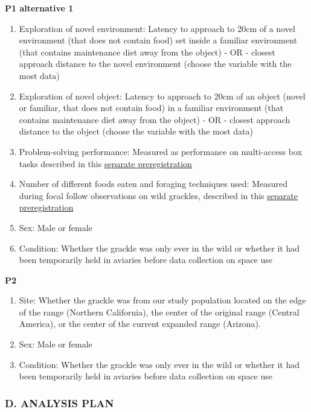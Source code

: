 \documentclass[]{article}
\begin{document}
\textbf{P1 alternative 1}

\begin{enumerate}
\def\labelenumi{\arabic{enumi})}
\item
  Exploration of novel environment: Latency to approach to 20cm of a
  novel environment (that does not contain food) set inside a familiar
  environment (that contains maintenance diet away from the object) - OR
  - closest approach distance to the novel environment (choose the
  variable with the most data)
\item
  Exploration of novel object: Latency to approach to 20cm of an object
  (novel or familiar, that does not contain food) in a familiar
  environment (that contains maintenance diet away from the object) - OR
  - closest approach distance to the object (choose the variable with
  the most data)
\item
  Problem-solving performance: Measured as performance on multi-access
  box tasks described in this
  \href{http://corinalogan.com/Preregistrations/g_flexmanip.html}{separate
  preregistration}
\item
  Number of different foods eaten and foraging techniques used: Measured
  during focal follow observations on wild grackles, described in this
  \href{http://corinalogan.com/Preregistrations/g_flexforaging.html}{separate
  preregistration}
\item
  Sex: Male or female
\item
  Condition: Whether the grackle was only ever in the wild or whether it
  had been temporarily held in aviaries before data collection on space
  use
\end{enumerate}

\textbf{P2}

\begin{enumerate}
\def\labelenumi{\arabic{enumi})}
\item
  Site: Whether the grackle was from our study population located on the
  edge of the range (Northern California), the center of the original
  range (Central America), or the center of the current expanded range
  (Arizona).
\item
  Sex: Male or female
\item
  Condition: Whether the grackle was only ever in the wild or whether it
  had been temporarily held in aviaries before data collection on space
  use
\end{enumerate}

\subsubsection{D. ANALYSIS PLAN}\label{d.-analysis-plan}
\end{document}
